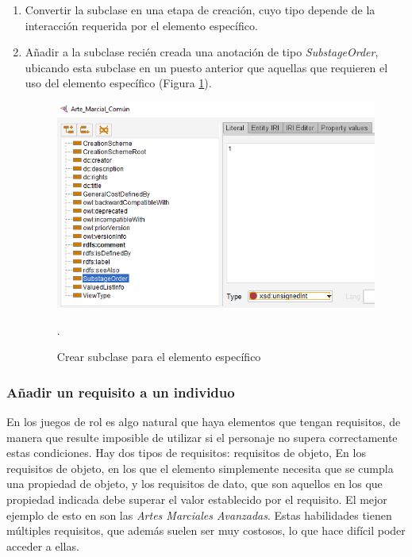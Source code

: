 \begin{enumerate}
    \item Convertir la subclase en una etapa de creación, cuyo tipo depende de la interacción requerida por el elemento específico.
    \item Añadir a la subclase recién creada una anotación de tipo \textit{SubstageOrder}, ubicando esta subclase en un puesto 
    anterior que aquellas que requieren el uso del elemento específico (Figura \ref*{ElementoComun_2}).
    \begin{figure}[H]
        \centering
        \includegraphics[scale=0.6]{Figures/Protege/ElementoComun_2.png}
        \caption{Crear subclase para el elemento específico}.
        \label{ElementoComun_2}
    \end{figure}

\end{enumerate}

\subsubsection{Añadir un requisito a un individuo}
En los juegos de rol es algo natural que haya elementos que tengan requisitos, de manera que resulte imposible de utilizar si 
el personaje no supera correctamente estas condiciones. Hay dos tipos de requisitos: requisitos de objeto, En los requisitos de objeto, 
en los que el elemento simplemente necesita que se cumpla una propiedad de objeto, y los requisitos de dato, que son aquellos en los que 
propiedad indicada debe superar el valor establecido por el requisito. El mejor ejemplo de esto en \anima son las 
\textit{Artes Marciales Avanzadas}. Estas habilidades tienen múltiples requisitos, que además suelen ser muy costosos, 
lo que hace difícil poder acceder a ellas. \medskip 

